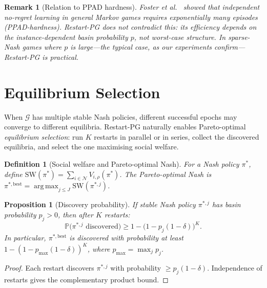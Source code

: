 \documentclass{article}
\newtheorem{proposition}[theorem]{Proposition}
\newtheorem{definition}[theorem]{Definition}
\newtheorem{remark}[theorem]{Remark}
\newcommand{\Prob}{\mathbb{P}}
\newcommand{\calN}{\mathcal{N}}
\newcommand{\calG}{\mathcal{G}}
\newcommand{\SW}{\mathrm{SW}}
\DeclareMathOperator*{\argmax}{arg\,max}
\begin{document}
\begin{remark}[Relation to PPAD hardness]
\label{rem:ppad}
Foster et al.~\cite{foster2023} showed that independent no-regret
learning in general Markov games requires exponentially many episodes
(PPAD-hardness). Restart-PG does not contradict this: its efficiency
depends on the \emph{instance-dependent} basin probability $p$,
not worst-case structure. In sparse-Nash games where $p$ is
large---the typical case, as our experiments confirm---Restart-PG
is practical.
\end{remark}

\section{Equilibrium Selection}
\label{sec:selection}

When $\calG$ has multiple stable Nash policies, different successful
epochs may converge to different equilibria. Restart-PG naturally
enables Pareto-optimal \emph{equilibrium selection}: run $K$ restarts
in parallel or in series, collect the discovered equilibria, and select
the one maximising social welfare.

\begin{definition}[Social welfare and Pareto-optimal Nash]
\label{def:welfare}
For a Nash policy $\pi^*$, define
$\SW(\pi^*) = \sum_{i \in \calN} V_{i,\rho}(\pi^*)$.
The \emph{Pareto-optimal Nash} is
$\pi^{*,\mathrm{best}} = \argmax_{j \le J} \SW(\pi^{*,j})$.
\end{definition}

\begin{proposition}[Discovery probability]
\label{prop:discovery}
If stable Nash policy $\pi^{*,j}$ has basin probability $p_j > 0$,
then after $K$ restarts:
\begin{equation}
  \label{eq:discovery}
  \Prob\bigl(\pi^{*,j} \text{ discovered}\bigr) \ge
  1 - \bigl(1 - p_j(1-\delta)\bigr)^K.
\end{equation}
In particular, $\pi^{*,\mathrm{best}}$ is discovered with probability
at least $1 - (1 - p_{\max}(1-\delta))^K$, where
$p_{\max} = \max_j p_j$.
\end{proposition}

\begin{proof}
Each restart discovers $\pi^{*,j}$ with probability $\ge p_j(1-\delta)$.
Independence of restarts gives the complementary product bound.
\end{proof}
\end{document}

